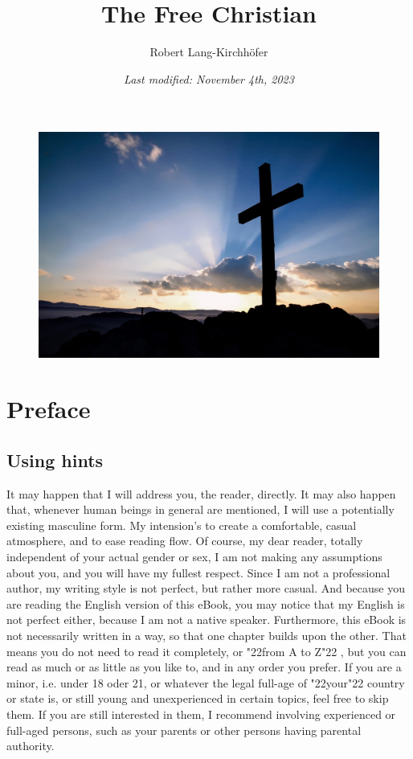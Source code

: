 \documentclass[10pt,a5paper]{article}
\title{\textbf{The Free Christian}}
\author{Robert Lang-Kirchh\"ofer}
\date{\textit{Last modified: November 4th, 2023}}
\newcommand{\q}[1]{\char"22{#1}\char"22 }
\begin{document}
	\setlength{\parindent}{0mm}
	\maketitle
	\begin{figure}[h]
		\centering
		\includegraphics[width=1\textwidth,keepaspectratio]{"FreeChristian.jpeg"}
	\end{figure}

	\newpage
	\tableofcontents

	\newpage
	\section{Preface}

	\subsection{Using hints}
		It may happen that I will address you,
		the reader,
		directly.
		It may also happen that,
		whenever human beings in general are mentioned,
		I will use a potentially existing masculine form.
		My intension's to create a comfortable,
		casual atmosphere,
		and to ease reading flow.
		Of course,
		my dear reader,
		totally independent of your actual gender or sex,
		I am not making any assumptions about you,
		and you will have my fullest respect.
		Since I am not a professional author,
		my writing style is not perfect,
		but rather more casual.
		And because you are reading the English version of this eBook,
		you may notice that my English is not perfect either,
		because I am not a native speaker.
		Furthermore,
		this eBook is not necessarily written in a way,
		so that one chapter builds upon the other.
		That means you do not need to read it completely,
		or \q{from A to Z},
		but you can read as much or as little as you like to,
		and in any order you prefer.
		If you are a minor,
		i.e. under 18 oder 21,
		or whatever the legal full-age of \q{your} country or state is,
		or still young and unexperienced in certain topics,
		feel free to skip them.
		If you are still interested in them,
		I recommend involving experienced or full-aged persons,
		such as your parents or other persons having parental authority.
	
\end{document}
